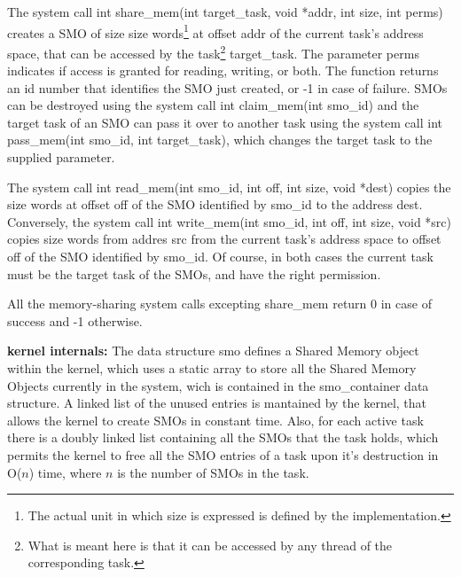 \documentclass[11pt, letterpaper, twoside, english]{book}
\begin{document}
The system call \textsf{int share\_mem(int target\_task, void *addr, int size, int perms)} creates a SMO of size \textsf{size} words\footnote{The actual unit in which size is expressed is defined by the implementation.} at offset \textsf{addr} of the current task's address space, that can be accessed by the task\footnote{What is meant here is that it can be accessed by any thread of the corresponding task.} \textsf{target\_task}. The parameter \textsf{perms} indicates if access is granted for reading, writing, or both. The function returns an id number that identifies the SMO just created, or -1 in case of failure. SMOs can be destroyed using the system call \textsf{int claim\_mem(int smo\_id)} and the target task of an SMO can pass it over to another task using the system call \textsf{int pass\_mem(int smo\_id, int target\_task)}, which changes the target task to the supplied parameter.

The system call \textsf{int read\_mem(int smo\_id, int off, int size, void *dest)} copies the \textsf{size} words at offset \textsf{off} of the SMO identified by \textsf{smo\_id} to the address \textsf{dest}. Conversely, the system call \textsf{int write\_mem(int smo\_id, int off, int size, void *src)} copies \textsf{size} words from addres \textsf{src} from the current task's address space to offset \textsf{off} of the SMO identified by \textsf{smo\_id}. Of course, in both cases the current task must be the target task of the SMOs, and have the right permission.

All the memory-sharing system calls excepting \textsf{share\_mem} return 0 in case of success and -1 otherwise.

\textbf{kernel internals:} The data structure \textsf{smo} defines a Shared Memory object within the kernel, which uses a static array to store all the Shared Memory Objects currently in the system, wich is contained in the \textsf{smo\_container} data structure. A linked list of the unused entries is mantained by the kernel, that allows the kernel to create SMOs in constant time. Also, for each active task there is a doubly linked list containing all the SMOs that the task holds, which permits the kernel to free all the SMO entries of a task upon it's destruction in O($n$) time, where $n$ is the number of SMOs in the task.
\end{document}
